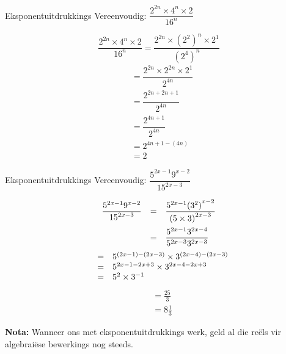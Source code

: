 \begin{wex}
{
Eksponentuitdrukkings
}
{
Vereenvoudig: $\dfrac{2^{2n} \times 4^n \times 2}{16^n}$
}
{

\begin{equation*}
  \dfrac{2^{2n} \times 4^n \times 2}{16^n} = \dfrac{2^{2n} \times (2^2)^n \times 2^1}{(2^4)^n} 
\end{equation*}
\begin{align*}
  &= \dfrac{2^{2n} \times 2^{2n} \times 2^1}{2^{4n}} \\
  &= \dfrac{2^{2n + 2n +1}}{2^{4n}} \\
  &= \dfrac{2^{4n+1}}{2^{4n}} \\
  &= 2^{4n+1-(4n)} \\
  &= 2
\end{align*}
}
\end{wex}


     \clearpage
\begin{wex}{Eksponentuitdrukkings}
{Vereenvoudig: $\dfrac{{5}^{2x-1}{9}^{x-2}}{{15}^{2x-3}}$}
{

\begin{equation*}
\begin{array}{lcl} \dfrac{{5}^{2x-1}  {9}^{x-2}}{{15}^{2x-3}}& =& \dfrac{{5}^{2x-1}  {({3}^{2})}^{x-2}}{{(5\times3)}^{2x-3}}\hfill \vspace{5pt}\\
		  & =& \dfrac{{5}^{2x-1}  {3}^{2x-4}}{{5}^{2x-3}  {3}^{2x-3}}\hfill 
\end{array}
\end{equation*}
\begin{equation*}
\begin{array}{lcl}
& =& {5}^{(2x-1)-(2x-3)} \times {3}^{(2x-4)-(2x-3)}\hfill \\ 
& =& 5^{2x-1-2x+3} \times 3^{2x-4 - 2x+3} \\
& =& {5}^{2} \times {3}^{-1}\hfill \end{array}
\end{equation*}
\begin{align*}
  &= \frac{25}{3} \\
  &= 8\frac{1}{3}
\end{align*}
}
\end{wex}

\textbf{Nota:} Wanneer ons met eksponentuitdrukkings werk, geld al die re\"els vir algebrai\"ese bewerkings nog steeds.

